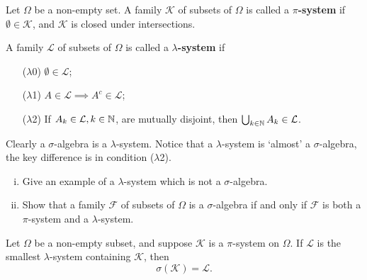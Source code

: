\begin{definition}
    Let $\Omega$ be a non-empty set. A family $\mathcal{K}$ of subsets of $\Omega$ is called a \textbf{$\pi$-system} if $\emptyset\in\mathcal{K}$, and $\mathcal{K}$ is closed under intersections.

    A family $\mathcal{L}$ of subsets of $\Omega$ is called a \textbf{$\lambda$-system} if
    \begin{enumerate}
        \item[($\lambda$0)] $\emptyset\in\mathcal{L}$;
        \item[($\lambda$1)] $A\in\mathcal{L} \implies A^c\in\mathcal{L}$;
        \item[($\lambda$2)] If $A_k\in\mathcal{L}, k\in\mathbb{N}$, are mutually disjoint, then $\bigcup_{k\in\mathbb{N}}A_k\in\mathcal{L}$.
    \end{enumerate}
\end{definition}
Clearly a $\sigma$-algebra is a $\lambda$-system. Notice that a $\lambda$-system is `almost' a $\sigma$-algebra, the key difference is in condition ($\lambda$2).

\begin{exercise}
\label{exer:pi-lambda}
\begin{enumerate}[(i)]
    \item Give an example of a $\lambda$-system which is not a $\sigma$-algebra.
    \item Show that a family $\mathcal{F}$ of subsets of $\Omega$ is a $\sigma$-algebra if and only if $\mathcal{F}$ is both a $\pi$-system and a $\lambda$-system.
\end{enumerate}
\end{exercise}

\begin{theorem}
\label{thm:pi-lambda}
Let $\Omega$ be a non-empty subset, and suppose $\mathcal{K}$ is a $\pi$-system on $\Omega$. If $\mathcal{L}$ is the smallest $\lambda$-system containing $\mathcal{K}$, then
\begin{equation*}
    \sigma(\mathcal{K}) = \mathcal{L}.
\end{equation*}
\end{theorem}


